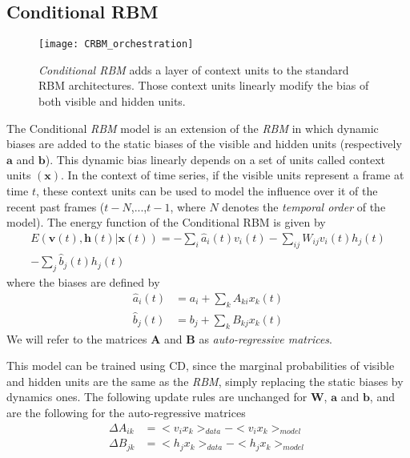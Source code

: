 \documentclass[letterpaper]{article}
\begin{document}
\subsection{Conditional RBM}
\begin{figure}
\centering
\texttt{[image: CRBM\_orchestration]}
\caption{\textit{Conditional RBM} adds a layer of context units to the standard RBM architectures. Those context units linearly modify the bias of both visible and hidden units.}
\end{figure}
The Conditional \textit{RBM} model \cite{taylor2009composable} is an extension of the \textit{RBM} in which dynamic biases are added to the static biases of the visible and hidden units (respectively $\bm{a}$ and $\bm{b}$). This dynamic bias linearly depends on a set of units called context units $(\bm{x})$. In the context of time series, if the visible units represent a frame at time $t$, these context units can be used to model the influence over it of the recent past frames ($t-N$,...,$t-1$, where $N$ denotes the \textit{temporal order} of the model).
The energy function of the Conditional RBM is given by
\begin{equation}
\begin{split}
\label{eq:energy_CRBM}
E(\bm{v}(t),\bm{h}(t)|\bm{x}(t)) =  - \sum_{i} \hat{a}_{i}(t)v_{i}(t) - \sum_{ij}W_{ij}v_{i}(t)h_{j}(t) \\ - \sum_{j} \hat{b}_{j}(t)h_{j}(t)
\end{split}
\end{equation}
where the biases are defined by 
\begin{align*}
\hat{a}_{i}(t) &= a_{i} + \sum_{k}A_{ki}x_{k}(t)\\
\hat{b}_{j}(t) &= b_{j} + \sum_{k}B_{kj}x_{k}(t)
\end{align*}
We will refer to the matrices $\bm{A}$ and $\bm{B}$ as \textit{auto-regressive matrices}.

This model can be trained using CD, since the marginal probabilities of visible and hidden units are the same as the \textit{RBM}, simply replacing the static biases by dynamics ones.
The following update rules are unchanged for $\bm{W}$, $\bm{a}$ and $\bm{b}$, and are the following for the auto-regressive matrices
\begin{align}
\Delta A_{ik} 	&=<v_{i}x_{k} >_{data} - <v_{i}x_{k} >_{model}\\
\Delta B_{jk} 	&= <h_{j}x_{k} >_{data} - <h_{j}x_{k} >_{model}\\
\end{align}
\end{document}
